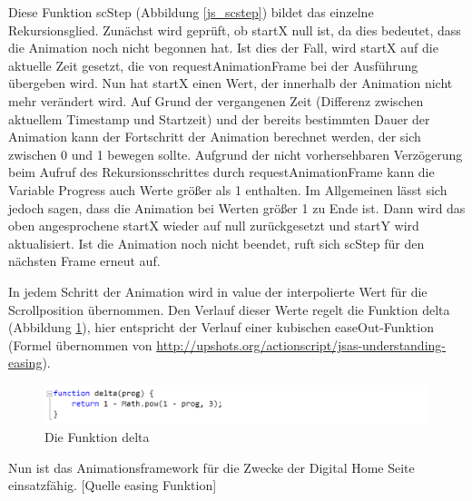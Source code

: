 Diese Funktion scStep (Abbildung \ref{js_scstep}) bildet das einzelne Rekursionsglied. Zunächst wird geprüft, ob startX null ist, da dies bedeutet, dass die Animation noch nicht begonnen hat. Ist dies der Fall, wird startX auf die aktuelle Zeit gesetzt, die von requestAnimationFrame bei der Ausführung übergeben wird. Nun hat startX einen Wert, der innerhalb der Animation nicht mehr verändert wird. Auf Grund der vergangenen Zeit (Differenz zwischen aktuellem Timestamp und Startzeit) und der bereits bestimmten Dauer der Animation kann der Fortschritt der Animation berechnet werden, der sich zwischen 0 und 1 bewegen sollte. Aufgrund der nicht vorhersehbaren Verzögerung beim Aufruf des Rekursionsschrittes durch requestAnimationFrame kann die Variable Progress auch Werte größer als 1 enthalten. Im Allgemeinen lässt sich jedoch sagen, dass die Animation bei Werten größer 1 zu Ende ist. Dann wird das oben angesprochene startX wieder auf null zurückgesetzt und startY wird aktualisiert. Ist die Animation noch nicht beendet, ruft sich scStep für den nächsten Frame erneut auf.

In jedem Schritt der Animation wird in value der interpolierte Wert für die Scrollposition übernommen. Den Verlauf dieser Werte regelt die Funktion delta (Abbildung \ref{js_delta}), hier entspricht der Verlauf einer kubischen easeOut-Funktion (Formel übernommen von \url{http://upshots.org/actionscript/jsas-understanding-easing}).

\begin{figure} [h]
\includegraphics[width=\textwidth]{./img/js_delta.png}
\caption{Die Funktion delta}
\label{js_delta}
\end{figure}

Nun ist das Animationsframework für die Zwecke der Digital Home Seite einsatzfähig.
[Quelle easing Funktion]

